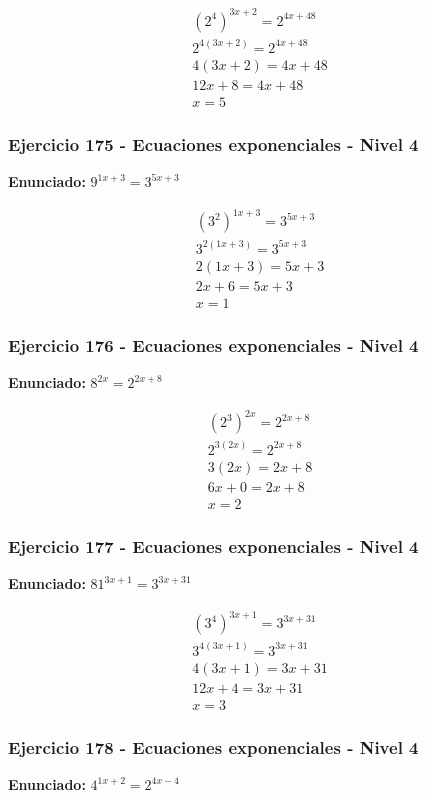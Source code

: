 \documentclass[12pt,a4paper]{article}
\begin{document}
\[
\begin{aligned}
(2^{4})^{3x+2}=2^{4x+48}\\
2^{4(3x+2)}=2^{4x+48}\\
4(3x+2)=4x+48\\
12x+8=4x+48\\
\boxed{x=5}
\end{aligned}
\]


\subsubsection*{Ejercicio 175 - Ecuaciones exponenciales - Nivel 4}
\textbf{Enunciado:} \(9^{1x+3}=3^{5x+3}\)

\[
\begin{aligned}
(3^{2})^{1x+3}=3^{5x+3}\\
3^{2(1x+3)}=3^{5x+3}\\
2(1x+3)=5x+3\\
2x+6=5x+3\\
\boxed{x=1}
\end{aligned}
\]


\subsubsection*{Ejercicio 176 - Ecuaciones exponenciales - Nivel 4}
\textbf{Enunciado:} \(8^{2x}=2^{2x+8}\)

\[
\begin{aligned}
(2^{3})^{2x}=2^{2x+8}\\
2^{3(2x)}=2^{2x+8}\\
3(2x)=2x+8\\
6x+0=2x+8\\
\boxed{x=2}
\end{aligned}
\]


\subsubsection*{Ejercicio 177 - Ecuaciones exponenciales - Nivel 4}
\textbf{Enunciado:} \(81^{3x+1}=3^{3x+31}\)

\[
\begin{aligned}
(3^{4})^{3x+1}=3^{3x+31}\\
3^{4(3x+1)}=3^{3x+31}\\
4(3x+1)=3x+31\\
12x+4=3x+31\\
\boxed{x=3}
\end{aligned}
\]


\subsubsection*{Ejercicio 178 - Ecuaciones exponenciales - Nivel 4}
\textbf{Enunciado:} \(4^{1x+2}=2^{4x-4}\)
\end{document}
